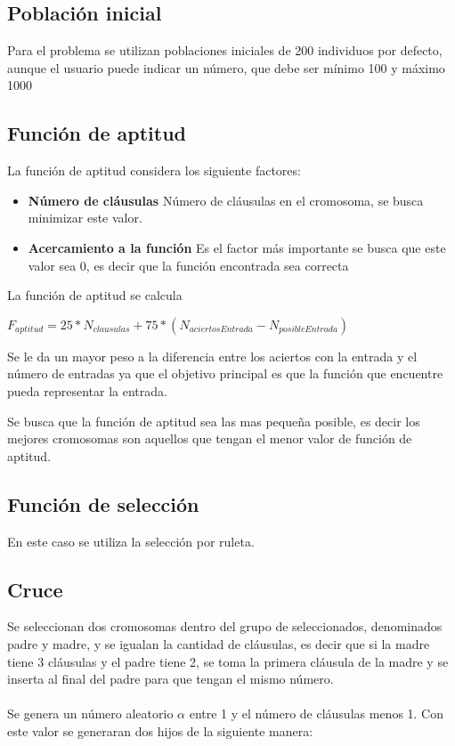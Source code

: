 \documentclass[letter]{article}
\begin{document}
\subsection{Población inicial}

Para el problema se utilizan poblaciones iniciales de 200 individuos por defecto, aunque el usuario puede indicar un número, que debe ser mínimo 100 y máximo 1000

\subsection{Función de aptitud}

La función de aptitud considera los siguiente factores:

\begin{itemize}
	\item \textbf{Número de cláusulas} Número de cláusulas en el cromosoma, se busca minimizar este valor.
	\item \textbf{Acercamiento a la función} Es el factor más importante se busca que este valor sea 0, es decir que la función encontrada sea correcta
\end{itemize}

La función de aptitud se calcula

$F_{aptitud}=25*N_{clausulas} + 75*(N_{aciertosEntrada} - N_{posibleEntrada})$

Se le da un mayor peso a la diferencia entre los aciertos con la entrada y el número de entradas ya que el objetivo principal es que la función que encuentre pueda representar la entrada.

Se busca que la función de aptitud sea las mas pequeña posible, es decir los mejores cromosomas son aquellos que tengan el menor valor de función de aptitud.

\subsection{Función de selección}

En este caso se utiliza la selección por ruleta.

\subsection{Cruce}

Se seleccionan dos cromosomas dentro del grupo de seleccionados, denominados padre y madre, y se igualan la cantidad de cláusulas, es decir que si la madre tiene 3 cláusulas y el padre tiene 2, se toma la primera cláusula de la madre y se inserta al final del padre para que tengan el mismo número.
\\\\
Se genera un número aleatorio $\alpha$ entre 1 y el número de cláusulas menos 1. Con este valor se generaran dos hijos de la siguiente manera:
\end{document}
